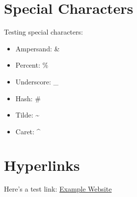 \documentclass{article}
\begin{document}
\section{Special Characters}
Testing special characters:
\begin{itemize}
    \item Ampersand: \&
    \item Percent: \%
    \item Underscore: \_
    \item Hash: \#
    \item Tilde: \textasciitilde{}
    \item Caret: \textasciicircum{}
\end{itemize}

\section{Hyperlinks}
Here's a test link: \href{https://example.com}{Example Website}
\end{document}
